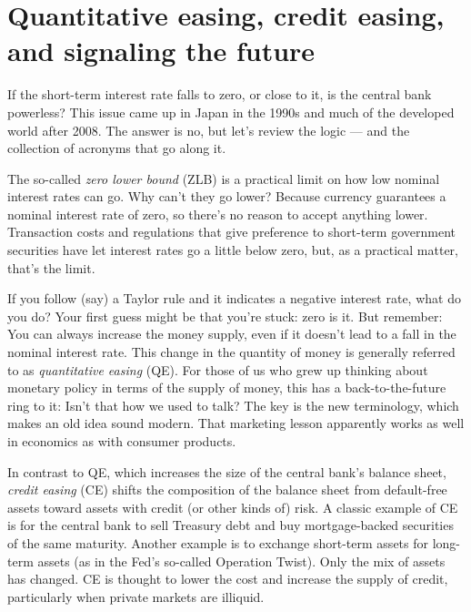 \section{Quantitative easing, credit easing, and signaling the future}

If the short-term interest rate falls to zero, or close to it,
is the central bank  powerless?
This issue came up in Japan in the 1990s and
much of the developed world after 2008.
The answer is no, but let's review the logic --- and the collection of acronyms that go along it.

The so-called {\it zero lower bound\/} (ZLB) is a practical
limit on how low nominal interest rates can go.
Why can't they go lower?
Because currency guarantees a nominal interest rate of zero,
so there's no reason to accept anything lower.
Transaction costs and regulations that give preference
to short-term government securities have let interest rates
go a little below zero, but, as a practical matter, that's the limit.

If you follow (say) a Taylor rule and it indicates a negative interest rate,
what do you do?
Your first guess might be that you're stuck:  zero is it.
But remember:  You can always increase the money supply,
even if it doesn't lead to a fall in the nominal interest rate.
This change in the quantity of money is generally referred to as
{\it   quantitative easing \/} (QE).
For those of us who grew up thinking about monetary policy in
terms of the supply of money,
this has a back-to-the-future ring to it:
Isn't that how we used to talk?
The key is the new terminology,
which makes an old idea sound modern.
That marketing lesson apparently works as well in economics
as with consumer products.

In contrast to QE, which increases the size of the central bank's 
balance sheet, 
{\it credit easing\/} (CE) shifts the composition of the balance sheet
from default-free assets toward assets with credit (or other kinds of) risk.
A classic example of CE is for the central bank  to sell Treasury debt
and buy mortgage-backed securities of the same maturity. Another example
is to exchange short-term assets for long-term assets (as in the Fed's
so-called Operation Twist).
Only the mix of assets has changed.
CE is thought to lower the cost and increase the supply of credit,
particularly when private markets are illiquid.

